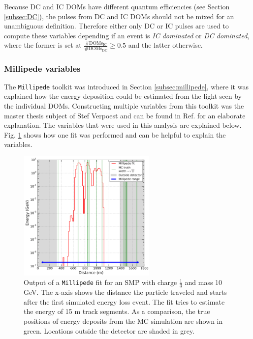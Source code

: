 Because DC and IC DOMs have different quantum efficiencies (see Section \ref{subsec:DC}), the pulses from DC and IC DOMs should not be mixed for an unambiguous definition. Therefore either only DC or IC pulses are used to compute these variables depending if an event is \textit{IC dominated} or \textit{DC dominated}, where the former is set at $\frac{\# \textrm{DOMs}_\textrm{IC}}{\# \textrm{DOMs}_\textrm{DC}} \geq 0.5$ and the latter otherwise.

\subsubsection{Millipede variables}
The \texttt{Millipede} toolkit was introduced in Section \ref{subsec:millipede}, where it was explained how the energy deposition could be estimated from the light seen by the individual DOMs. Constructing multiple variables from this toolkit was the master thesis subject of Stef Verpoest and can be found in Ref. \cite{steffthesis} for an elaborate explanation. The variables that were used in this analysis are explained below. Fig. \ref{fig:millipedeoutput} shows how one fit was performed and can be helpful to explain the variables.

\begin{figure}[ht]
\centering
\includegraphics[width=0.6\textwidth]{chapter8/img/millipedeStef.png}
\caption{Output of a \texttt{Millipede} fit for an SMP with charge $\frac{1}{3}$ and mass 10 GeV. The x-axis shows the distance the particle traveled and starts after the first simulated energy loss event. The fit tries to estimate the energy of 15 m track segments. As a comparison, the true positions of energy deposits from the MC simulation are shown in green. Locations outside the detector are shaded in grey.}
\label{fig:millipedeoutput}
\end{figure}

